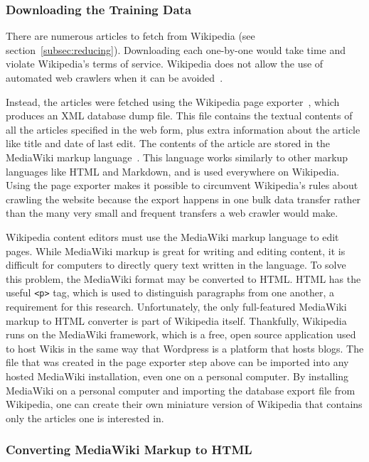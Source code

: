 \subsubsection{Downloading the Training Data}

There are numerous articles to fetch from Wikipedia (see section~\ref{subsec:reducing}).
Downloading each one-by-one would take time and violate Wikipedia's terms of service. Wikipedia does not allow the use of automated web crawlers when it can be avoided~\cite{wiki-robots}.

Instead, the articles were fetched using the Wikipedia page exporter~\cite{wiki-exporter}, which produces an XML database dump file.
This file contains the textual contents of all the articles specified in the web form, plus extra information about the article like title and date of last edit.
The contents of the article are stored in the MediaWiki markup language~\cite{mediawiki-markup}.
This language works similarly to other markup languages like HTML and Markdown, and is used everywhere on Wikipedia.
Using the page exporter makes it possible to circumvent Wikipedia's rules about crawling the website because the export happens in one bulk data transfer rather than the many very small and frequent transfers a web crawler would make.

Wikipedia content editors must use the MediaWiki markup language to edit pages. 
While MediaWiki markup is great for writing and editing content, it is difficult for computers to directly query text written in the language.
To solve this problem, the MediaWiki format may be converted to HTML.
HTML has the useful {\tt <p>} tag, which is used to distinguish paragraphs from one another, a requirement for this research. 
Unfortunately, the only full-featured MediaWiki markup to HTML converter is part of Wikipedia itself.
Thankfully, Wikipedia runs on the MediaWiki framework, which is a free, open source application used to host Wikis in the same way that Wordpress is a platform that hosts blogs.
The file that was created in the page exporter step above can be imported into any hosted MediaWiki installation, even one on a personal computer.
By installing MediaWiki on a personal computer and importing the database export file from Wikipedia, one can create their own miniature version of Wikipedia that contains only the articles one is interested in.

\subsubsection{Converting MediaWiki Markup to HTML}


